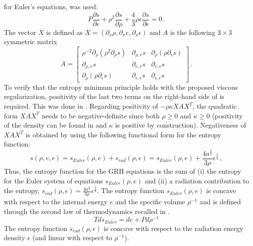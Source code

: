 \documentclass[times,doublespace]{fldauth}%
\begin{document}
for Euler's equations, was used:
%
\begin{equation} 
\label{eq:visc_reg_assumptions}
P \frac{\partial s}{\partial e} + \rho^2 \frac{\partial s}{\partial \rho} + \frac{4}{3} \rho \epsilon \frac{\partial s}{\partial \epsilon} = 0 \,. 
\end{equation}
%
The vector $X$ is defined as $X=\left( \partial_x \rho, \partial_x e, \partial_x \epsilon \right)$ and $A$ is the 
following $3 \times 3$ symmetric matrix
%
 \begin{equation}
 A = 
\begin{bmatrix}
\rho^{-2}\partial_{\rho} \left( \rho^2 \partial_{\rho} s \right) & \partial_{\rho,e} s & \partial_{\rho} \left( \rho \partial_{\epsilon} s \right) \\
 \partial_{\rho,e} s & \partial_{e,e} s & \partial_{e,\epsilon} s \\
 \partial_{\rho} \left( \rho \partial_{\epsilon} s \right) & \partial_{e,\epsilon} s & \partial_{\epsilon,\epsilon} s
\end{bmatrix}
\,.
\end{equation}
%
To verify that the entropy minimum principle holds with the proposed viscous regularization,
positivity of the last two terms on the right-hand side of  is required. 
This was done in \cite{our_jcp_radhy_paper}. Regarding positivity of $- \rho \kappa X A X^T$, the quadratic form $ X A 
X^T$ needs to be negative-definite since both $\rho \geq 0$ and $\kappa \geq 0$ (positivity of the density can be found
in \cite{jlg} and $\kappa$ is positive by construction). Negativeness of $X A X^T$ is obtained by using the following
functional form for the entropy function:
%
\begin{equation}
\label{eq:ent_equ}
s( \rho, e, \epsilon) = s_{Euler}(\rho, e) + s_{rad}(\rho, \epsilon) = s_{Euler}(\rho, e)+ \frac{4a^{\tfrac{1}{4}}}{3\rho} \epsilon^{\tfrac{3}{4}} \, ,
\end{equation}
%
Thus, the entropy function for the GRH equations is the sum of (i) the entropy for the Euler system of equations 
$s_{Euler}(\rho, e)$ and (ii) a radiation contribution to the entropy,
$s_{rad}(\rho,\epsilon)=\tfrac{4 a^\frac{1}{4}}{3\rho} \epsilon^\frac{3}{4}$. 
The entropy function $s_{Euler}(\rho, e)$ is concave with respect to the internal energy $e$ and the specific volume 
$\rho^{-1}$ and is defined through the second law of thermodynamics recalled in .
%
\begin{equation}\label{eq:scn-law-th}
Tds_{Euler} = de + P d \rho^{-1}
\end{equation}
%
The entropy function $s_{rad}(\rho,\epsilon)$ is concave with respect to the radiation energy density $\epsilon$
(and linear with respect to $\rho^{-1}$). 
\end{document}
